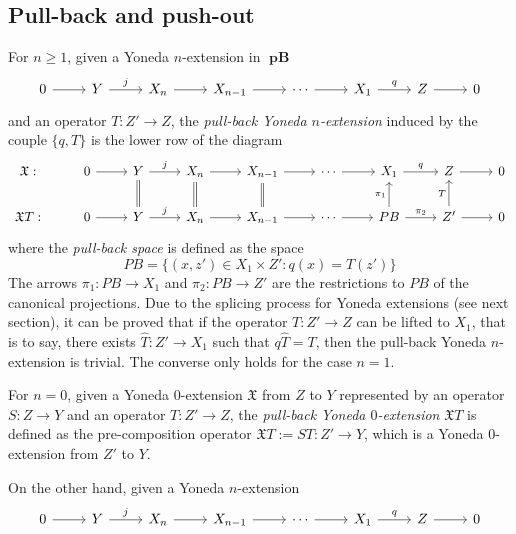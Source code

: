 \documentclass[12pt,a4paper]{amsproc}
\theoremstyle{remark}
\theoremstyle{definition}
\newcommand{\pBan}{\operatorname{\textbf{pB}}}
\numberwithin{equation}{section}
\begin{document}
	\subsection{Pull-back and push-out} \label{sec:pre_2.4}
    For $n \geq 1$, given a Yoneda $n$-extension in $\boldsymbol{\pBan}$
	\begin{equation}
		\notag
		\begin{tikzcd}
			0 \arrow[r] & Y \arrow[r, "j"] & X_n \arrow[r] & X_{n-1} \arrow[r] & \cdots \arrow[r] & X_1 \arrow[r, "q"] & Z \arrow[r] & 0
		\end{tikzcd}
	\end{equation}
	and an operator $T: Z' \to Z$, the \emph{pull-back Yoneda $n$-extension} induced by the couple $\lbrace q, T \rbrace$ is the lower row of the diagram 
    \begin{equation}
	\notag 
	\begin{tikzcd}
		\mathfrak{X}: & 0 \arrow[r] & Y \arrow[r, "j"] \arrow[d, equal] & X_n \arrow[r] \arrow[d, equal] & X_{n-1} \arrow[r] \arrow[d, equal] & \cdots \arrow[r] & X_1 \arrow[r, "q"] & Z \arrow[r] & 0 \\
		\mathfrak{X}T: & 0 \arrow[r] & Y \arrow[r, "j"] & X_n \arrow[r] & X_{n-1} \arrow[r] & \cdots \arrow[r] & PB \arrow[r, "\pi_2"] \arrow[u, "\pi_1"] & Z' \arrow[r] \arrow[u, "T"] & 0
	\end{tikzcd}
\end{equation}
	where the \emph{pull-back space} is defined as the space 
	$$PB=\lbrace (x,z') \in X_1 \times Z':q(x)=T(z') \rbrace$$
	The arrows $\pi_1:PB \to X_1$ and $\pi_2:PB \to Z'$ are the restrictions to $PB$ of the canonical projections. Due to the splicing process for Yoneda extensions (see next section), it can be proved that if the operator $T:Z' \to Z$ can be lifted to $X_1$, that is to say, there exists  $\hat{T}:Z' \to X_1$ such that $q \hat{T}=T$, then the pull-back Yoneda $n$-extension is trivial. The converse only holds for the case $n=1$. 
    \par For $n = 0$, given a Yoneda $0$-extension $\mathfrak{X}$ from $Z$ to $Y$ represented by an operator $S: Z \to Y$ and an operator $T: Z' \to Z$, the \emph{pull-back Yoneda $0$-extension} $\mathfrak{X}T$ is defined as the pre-composition operator $\mathfrak{X}T := ST: Z' \to Y$,
which is a Yoneda $0$-extension from $Z'$ to $Y$. 
	\par On the other hand, given a Yoneda $n$-extension
	\begin{equation}
		\notag
		\begin{tikzcd}
			0 \arrow[r] & Y \arrow[r, "j"] & X_n \arrow[r] & X_{n-1} \arrow[r] & \cdots \arrow[r] & X_1 \arrow[r, "q"] & Z \arrow[r] & 0
		\end{tikzcd}
	\end{equation} 
\end{document}
